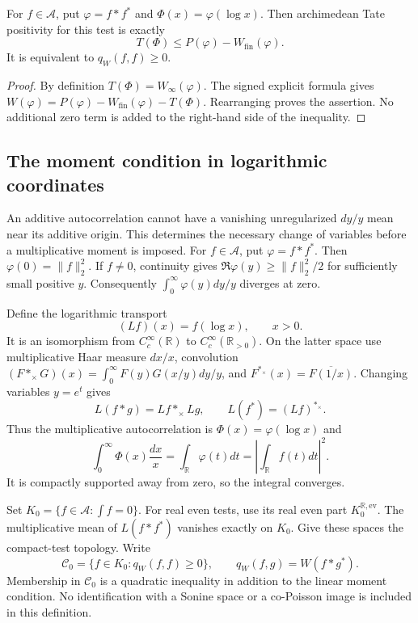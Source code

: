 \begin{proposition}
\label{v4-arith:w7-i:prop:guinand-as-hilbert}
For $f\in\mathscr A$, put $\varphi=f*f^*$ and
$\Phi(x)=\varphi(\log x)$. Then archimedean Tate positivity for
this test is exactly
\begin{equation}
\label{v4-arith:w7-i:eq:guinand-hilbert}
 T(\Phi)\le P(\varphi)-W_{\mathrm{fin}}(\varphi).
\end{equation}
It is equivalent to $q_W(f,f)\ge0$.
\end{proposition}
\begin{proof}
By definition $T(\Phi)=W_\infty(\varphi)$.
The signed explicit formula gives
$W(\varphi)=P(\varphi)-W_{\mathrm{fin}}(\varphi)-T(\Phi)$.
Rearranging proves the assertion. No additional zero term is
added to the right-hand side of the inequality.
\end{proof}

\subsection{The moment condition in logarithmic coordinates}
\label{v4-arith:w7-i:copoisson:subclass}

An additive autocorrelation cannot have a vanishing unregularized
$dy/y$ mean near its additive origin. This determines the necessary
change of variables before a multiplicative moment is imposed.
For $f\in\mathscr A$, put $\varphi=f*f^*$. Then
$\varphi(0)=\|f\|_2^2$. If $f\ne0$, continuity gives
$\Re\varphi(y)\ge\|f\|_2^2/2$ for sufficiently small positive $y$.
Consequently $\int_0^\infty\varphi(y)dy/y$ diverges at zero.

Define the logarithmic transport
\[
 (Lf)(x)=f(\log x),\qquad x>0.
\]
It is an isomorphism from $C_c^\infty(\mathbb R)$ to
$C_c^\infty(\mathbb R_{>0})$. On the latter space use multiplicative
Haar measure $dx/x$, convolution
$(F*_\times G)(x)=\int_0^\infty F(y)G(x/y)dy/y$, and
$F^{*_{\times}}(x)=\overline{F(1/x)}$.
Changing variables $y=e^t$ gives
\[
 L(f*g)=Lf*_\times Lg,\qquad L(f^*)=(Lf)^{*_{\times}}.
\]
Thus the multiplicative autocorrelation is
$\Phi(x)=\varphi(\log x)$ and
\[
 \int_0^\infty\Phi(x)\frac{dx}{x}
 =\int_{\mathbb R}\varphi(t)dt=\left|\int_{\mathbb R}f(t)dt\right|^2.
\]
It is compactly supported away from zero, so the integral converges.

\begin{definition}
\label{v4-arith:w7-i:def:copoisson-class}
Set $K_0=\{f\in\mathscr A:\int f=0\}$.
For real even tests, use its real even part $K_0^{\mathbb R,\mathrm{ev}}$.
The multiplicative mean of $L(f*f^*)$ vanishes exactly on $K_0$.
Give these spaces the compact-test topology. Write
\[
 \mathcal C_0=\{f\in K_0:q_W(f,f)\ge0\},
 \qquad q_W(f,g)=W(f*g^*).
\]
Membership in $\mathcal C_0$ is a quadratic inequality in addition
to the linear moment condition. No identification with a Sonine
space or a co-Poisson image is included in this definition.
\end{definition}

